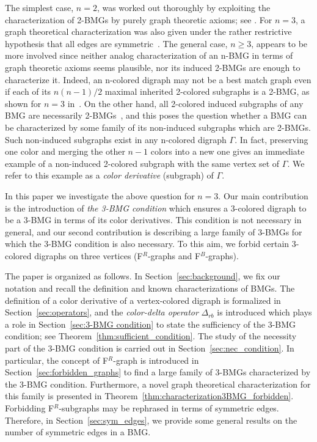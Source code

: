 \documentclass[final,3p,times]{elsarticle}
\begin{document}
The simplest case, $n=2$, was worked out thoroughly by exploiting the characterization of 2-BMGs by purely graph theoretic axioms; see \cite{Geiss:19a,Geiss:20b,Korchmaros:21a,korchmaros2021quasi,Schaller:21a,Schaller:21b,Schaller:21c,Schaller:21d}. For $n=3$, a graph theoretical characterization was also given under the rather restrictive hypothesis that all edges are symmetric~\cite{geiss2020reciprocal}. The general case, $n\ge 3$, appears to be more involved since neither analog characterization of an n-BMG in terms of graph theoretic axioms seems plausible, nor its induced 2-BMGs are enough to characterize it. Indeed, an n-colored digraph may not be a best match graph even if each of its $n(n-1)/2$ maximal inherited 2-colored subgraphs is a 2-BMG, as shown for $n=3$ in~\cite[Figure 1]{schaller2021corrigendum}. On the other hand, all 2-colored induced subgraphs of any BMG are necessarily 2-BMGs~\cite[Corollary 5]{Geiss:19a}, and this poses the question whether a BMG can be characterized by some family of its non-induced subgraphs which are 2-BMGs. Such non-induced subgraphs exist in any n-colored digraph $\Gamma$. In fact, preserving one color and merging the other $n-1$ colors into a new one gives an immediate example of a non-induced 2-colored subgraph with the same vertex set of $\Gamma$. We refer to this example as a \emph{color derivative} (subgraph) of $\Gamma$.

In this paper we investigate the above question for $n=3$. Our main contribution is the introduction of \emph{the 3-BMG condition} which ensures a 3-colored digraph to be a 3-BMG in terms of its color derivatives. This condition is not necessary in general, and our second contribution is describing a large family of 3-BMGs for which the 3-BMG condition is also necessary. To this aim, we forbid certain 3-colored digraphs on three vertices (F$^R$-graphs and F$^B$-graphs). 

The paper is organized as follows. In Section~\ref{sec:background}, we fix our notation and recall the definition and known characterizations of BMGs. The definition of a color derivative of a vertex-colored digraph is formalized in Section~\ref{sec:operators}, and the \emph{color-delta operator} $\Delta_{rb}$ is introduced which plays a role in Section~\ref{sec:3-BMG condition} to state the sufficiency of the 3-BMG condition; see Theorem~\ref{thm:sufficient_condition}. The study of the necessity part of the 3-BMG condition is carried out in Section~\ref{sec:nec_condition}. In particular, the concept of F$^R$-graph is introduced in Section~\ref{sec:forbidden_graphs} to find a large family of 3-BMGs characterized by the 3-BMG condition. Furthermore, a novel graph theoretical characterization for this family is presented in Theorem~\ref{thm:characterization3BMG_forbidden}. Forbidding F$^R$-subgraphs may be rephrased in terms of symmetric edges. Therefore, in Section~\ref{sec:sym_edges}, we provide some general results on the number of symmetric edges in a BMG.
\end{document}
